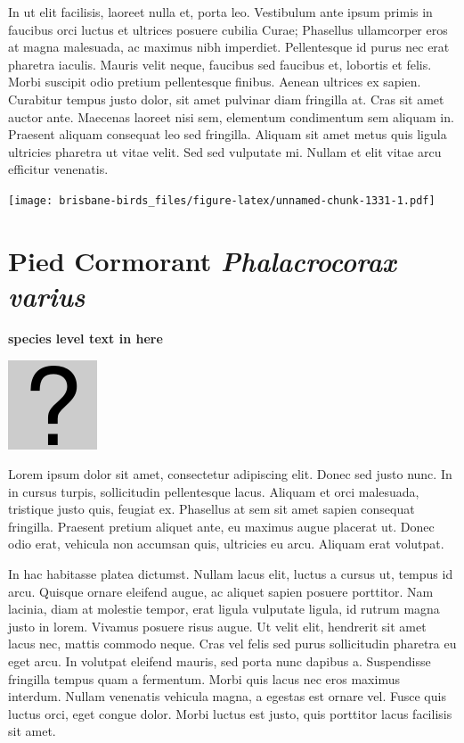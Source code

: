 \documentclass[]{book}
\let\origfigure\figure
\let\endorigfigure\endfigure
\renewenvironment{figure}[1][2] {
  \expandafter\origfigure\expandafter[H]
} {
  \endorigfigure
}
\begin{document}
In ut elit facilisis, laoreet nulla et, porta leo. Vestibulum ante ipsum
primis in faucibus orci luctus et ultrices posuere cubilia Curae;
Phasellus ullamcorper eros at magna malesuada, ac maximus nibh
imperdiet. Pellentesque id purus nec erat pharetra iaculis. Mauris velit
neque, faucibus sed faucibus et, lobortis et felis. Morbi suscipit odio
pretium pellentesque finibus. Aenean ultrices ex sapien. Curabitur
tempus justo dolor, sit amet pulvinar diam fringilla at. Cras sit amet
auctor ante. Maecenas laoreet nisi sem, elementum condimentum sem
aliquam in. Praesent aliquam consequat leo sed fringilla. Aliquam sit
amet metus quis ligula ultricies pharetra ut vitae velit. Sed sed
vulputate mi. Nullam et elit vitae arcu efficitur venenatis.

\begin{figure}
\centering
\texttt{[image: brisbane-birds\_files/figure-latex/unnamed-chunk-1331-1.pdf]}
\caption{\label{fig:unnamed-chunk-1331}insert figure caption}
\end{figure}

\section{\texorpdfstring{Pied Cormorant \emph{Phalacrocorax
varius}}{Pied Cormorant Phalacrocorax varius}}\label{pied-cormorant-phalacrocorax-varius}

\textbf{species level text in here}

\begin{figure}
\centering
\includegraphics{assets/missing.png}
\caption{No image for species}
\end{figure}

Lorem ipsum dolor sit amet, consectetur adipiscing elit. Donec sed justo
nunc. In in cursus turpis, sollicitudin pellentesque lacus. Aliquam et
orci malesuada, tristique justo quis, feugiat ex. Phasellus at sem sit
amet sapien consequat fringilla. Praesent pretium aliquet ante, eu
maximus augue placerat ut. Donec odio erat, vehicula non accumsan quis,
ultricies eu arcu. Aliquam erat volutpat.

In hac habitasse platea dictumst. Nullam lacus elit, luctus a cursus ut,
tempus id arcu. Quisque ornare eleifend augue, ac aliquet sapien posuere
porttitor. Nam lacinia, diam at molestie tempor, erat ligula vulputate
ligula, id rutrum magna justo in lorem. Vivamus posuere risus augue. Ut
velit elit, hendrerit sit amet lacus nec, mattis commodo neque. Cras vel
felis sed purus sollicitudin pharetra eu eget arcu. In volutpat eleifend
mauris, sed porta nunc dapibus a. Suspendisse fringilla tempus quam a
fermentum. Morbi quis lacus nec eros maximus interdum. Nullam venenatis
vehicula magna, a egestas est ornare vel. Fusce quis luctus orci, eget
congue dolor. Morbi luctus est justo, quis porttitor lacus facilisis sit
amet.
\end{document}
